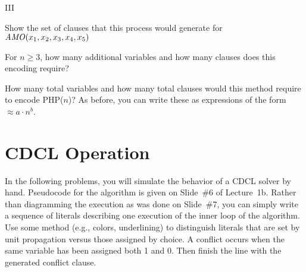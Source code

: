 \begin{problem}{III}
\begin{choice}
\item
  Show the set of clauses that this process would generate for ${\it AMO}(x_1, x_2, x_3, x_4, x_5)$

\item
  For $n \geq 3$, how many additional variables and how many clauses does this encoding require?
    
\item
  How many total variables and how many total clauses would this
  method require to encode PHP($n$)?  As before, you can write these as
  expressions of the form $\approx a\cdot n^b$.

\end{choice}
\end{problem}

\newpage

\section*{CDCL Operation}

In the following problems, you will simulate the behavior of a CDCL
solver by hand.  Pseudocode for the algorithm is given on Slide~\#6 of
Lecture~1b.  Rather than diagramming the execution as was done on
Slide~\#7, you can simply write a sequence of literals describing one
execution of the inner loop of the algorithm.  Use some method (e.g.,
colors, underlining) to distinguish literals that are set by unit
propagation versus those assigned by choice.  A conflict occurs when
the same variable has been assigned both 1 and 0.  Then finish the
line with the generated conflict clause.

